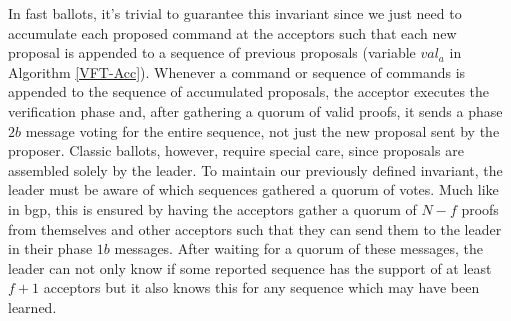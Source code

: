 In fast ballots, it's trivial to guarantee this invariant since we just need to accumulate each proposed command at the acceptors such that each new proposal is appended to a sequence of previous proposals (variable $val_a$ in Algorithm \ref{VFT-Acc}). Whenever a command or sequence  of commands is appended to the sequence of accumulated proposals, the acceptor executes the verification phase and, after gathering a quorum of valid proofs, it sends a phase $2b$ message voting for the entire sequence, not just the new proposal sent by the proposer. Classic ballots, however, require special care, since proposals are assembled solely by the leader. To maintain our previously defined invariant, the leader must be aware of which sequences gathered a quorum of votes. Much like in \acrshort{bgp}, this is ensured by having the acceptors gather a quorum of $N-f$ proofs from themselves and other acceptors such that they can send them to the leader in their phase $1b$ messages. After waiting for a quorum of these messages, the leader can not only know if some reported sequence has the support of at least $f+1$ acceptors but it also knows this for any sequence which may have been learned. \par


